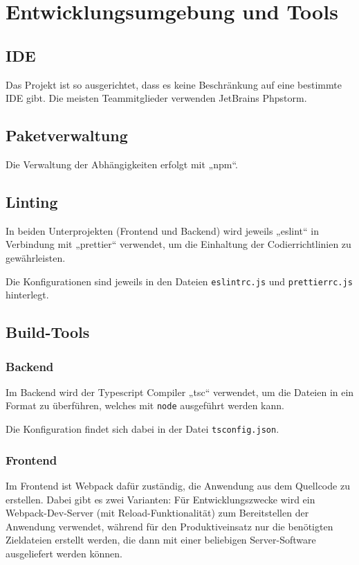 \documentclass[letterpaper, 10 pt, conference]{ieeeconf}
\begin{document}
\section{Entwicklungsumgebung und Tools}

\subsection{IDE}

Das Projekt ist so ausgerichtet, dass es keine Beschränkung auf eine bestimmte IDE gibt.
Die meisten Teammitglieder verwenden JetBrains Phpstorm.

\subsection{Paketverwaltung}

Die Verwaltung der Abhängigkeiten erfolgt mit „npm“.

\subsection{Linting}

In beiden Unterprojekten (Frontend und Backend) wird jeweils „eslint“ in Verbindung mit „prettier“ verwendet,
um die Einhaltung der Codierrichtlinien zu gewährleisten.

Die Konfigurationen sind jeweils in den Dateien \texttt{eslintrc.js} und \texttt{prettierrc.js} hinterlegt.

\subsection{Build-Tools}

\subsubsection{Backend}

Im Backend wird der Typescript Compiler „tsc“ verwendet, um die Dateien in ein Format zu überführen,
welches mit \texttt{node} ausgeführt werden kann.

Die Konfiguration findet sich dabei in der Datei \texttt{tsconfig.json}.

\subsubsection{Frontend}

Im Frontend ist Webpack dafür zuständig, die Anwendung aus dem Quellcode zu erstellen.
Dabei gibt es zwei Varianten:
Für Entwicklungszwecke wird ein Webpack-Dev-Server (mit Reload-Funktionalität) zum Bereitstellen der Anwendung verwendet,
während für den Produktiveinsatz nur die benötigten Zieldateien erstellt werden, die dann mit einer beliebigen Server-Software ausgeliefert werden können.
\end{document}
